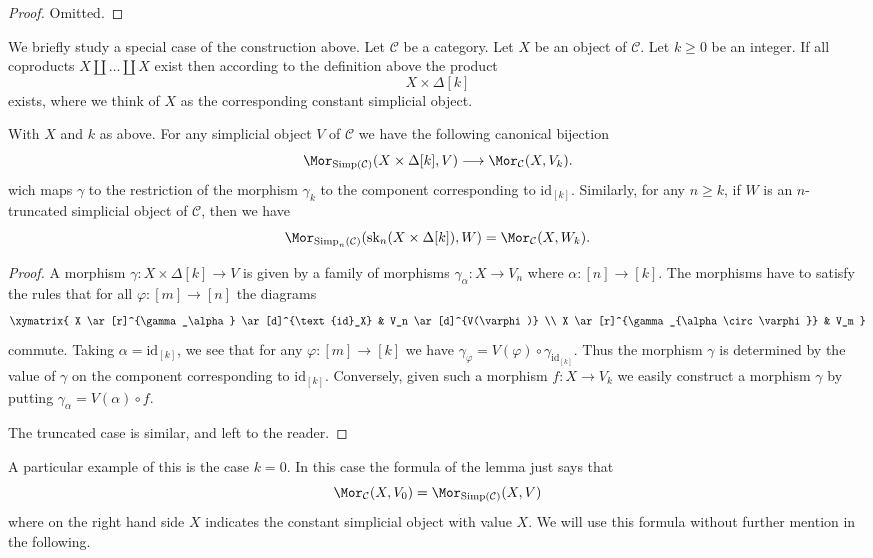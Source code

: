 \begin{proof}
Omitted.
\end{proof}

\noindent
We briefly study a special case of the construction
above. Let $\mathcal{C}$ be a category.
Let $X$ be an object of $\mathcal{C}$.
Let $k \geq 0$ be an integer.
If all coproducts $X \coprod \ldots \coprod X$ exist
then according to the definition above the product
$$
X \times \Delta[k]
$$
exists, where we think of $X$ as the corresponding constant
simplicial object.

\begin{lemma}
\label{lemma-morphism-from-coproduct}
With $X$ and $k$ as above.
For any simplicial object $V$ of
$\mathcal{C}$ we have the following
canonical bijection
$$
\Mor_{\text{Simp}(\mathcal{C})}(X \times \Delta[k], V)
\longrightarrow
\Mor_\mathcal{C}(X, V_k).
$$
wich maps $\gamma$ to the restriction of the
morphism $\gamma_k$ to the component corresponding
to $\text{id}_{[k]}$.
Similarly, for any $n \geq k$, if $W$ is an
$n$-truncated simplicial object
of $\mathcal{C}$, then we have
$$
\Mor_{\text{Simp}_n(\mathcal{C})}(\text{sk}_n(X \times \Delta[k]), W)
=
\Mor_\mathcal{C}(X, W_k).
$$
\end{lemma}

\begin{proof}
A morphism $\gamma : X \times \Delta[k] \to V$ is given by
a family of morphisms $\gamma_\alpha : X \to V_n$ where
$\alpha : [n] \to [k]$. The morphisms have to satisfy the
rules that for all $\varphi : [m] \to [n]$ the diagrams
$$
\xymatrix{
X \ar[r]^{\gamma_\alpha} \ar[d]^{\text{id}_X} & V_n \ar[d]^{V(\varphi)} \\
X \ar[r]^{\gamma_{\alpha \circ \varphi}} & V_m
}
$$
commute. Taking $\alpha = \text{id}_{[k]}$, we see that
for any $\varphi : [m] \to [k]$ we have $\gamma_\varphi =
V(\varphi) \circ \gamma_{\text{id}_{[k]}}$. Thus the morphism
$\gamma$ is determined by the value of $\gamma$ on the
component corresponding to $\text{id}_{[k]}$. Conversely,
given such a morphism $f : X \to V_k$ we easily
construct a morphism $\gamma$ by putting
$\gamma_\alpha = V(\alpha) \circ f$.

\medskip\noindent
The truncated case is similar, and left to the reader.
\end{proof}

\noindent
A particular example of this is the case $k = 0$.
In this case the formula of the lemma just says
that
$$
\Mor_\mathcal{C}(X, V_0)
=
\Mor_{\text{Simp}(\mathcal{C})}(X, V)
$$
where on the right hand side $X$ indicates the
constant simplicial object with value $X$. We will
use this formula without further mention in the
following.




